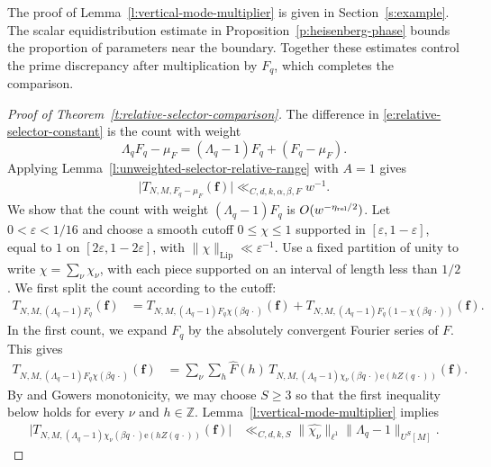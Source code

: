 \documentclass[12pt]{amsart}
\newcommand{\1}{\mathbf 1}
\newcommand{\e}{\mathrm e}
\theoremstyle{definition}
\begin{document}
The proof of Lemma~\ref{l:vertical-mode-multiplier} is given in
Section~\ref{s:example}. The scalar equidistribution estimate in
Proposition~\ref{p:heisenberg-phase} bounds the proportion of
parameters near the boundary. Together these estimates control
the prime discrepancy after multiplication by \(F_q\), which
completes the comparison.

\begin{proof}[Proof of Theorem~\ref{t:relative-selector-comparison}]
 The difference in
\eqref{e:relative-selector-constant} is the count with weight
\[
 \Lambda_qF_q-\mu_F=(\Lambda_q-1)F_q+(F_q-\mu_F).
\]
Applying Lemma~\ref{l:unweighted-selector-relative-range} with
\(A=1\) gives
\begin{align}\label{e:f-muf}
    \bigl|T_{N,M,F_q-\mu_F}(\mathbf f)\bigr|
 \ll_{C,d,k,\alpha,\beta,F} w^{-1}.
\end{align}
We show that the count
with weight \((\Lambda_q-1)F_q\) is \(O(w^{-\eta_{\rm rel}/2})\).
Let \(0<\varepsilon<1/16\) and choose a smooth cutoff
\(0\le\chi\le1\) supported in \([\varepsilon,1-\varepsilon]\),
equal to \(1\) on \([2\varepsilon,1-2\varepsilon]\), with
\(\|\chi\|_{\mathrm{Lip}}\ll\varepsilon^{-1}\). Use a fixed
partition of unity to write \(\chi=\sum_\nu\chi_\nu\), with each
piece supported on an interval of length less than \(1/2\).
We first split the count according to the cutoff:
\begin{align}\label{e:firstsecondterms}
 T_{N,M,(\Lambda_q-1)F_q}(\mathbf f)
 &=T_{N,M,(\Lambda_q-1)F_q\chi(\beta q\,\cdot)}(\mathbf f)+T_{N,M,(\Lambda_q-1)F_q(1-\chi(\beta q\,\cdot))}
   (\mathbf f).
\end{align}
In the first count, we expand \(F_q\) by the absolutely convergent
Fourier series of \(F\). This gives
\[
\begin{aligned}
 T_{N,M,(\Lambda_q-1)F_q\chi(\beta q\,\cdot)}(\mathbf f)
 &=\sum_\nu\sum_{h}\widehat F(h)\,
   T_{N,M,(\Lambda_q-1)\chi_\nu(\beta q\,\cdot)
     \e(hZ(q\,\cdot))}(\mathbf f).
\end{aligned}
\]
By \cite[Proposition~3.3]{KMTT} and Gowers monotonicity, we may
choose \(S\ge3\) so that the first inequality below holds for
every \(\nu\) and \(h\in\mathbb Z\). 
Lemma~\ref{l:vertical-mode-multiplier} implies
\begin{equation}\label{e:high-order-gvn}
\begin{aligned}
 \bigl|T_{N,M,(\Lambda_q-1)\chi_\nu(\beta q\,\cdot)
                  \e(hZ(q\,\cdot))}(\mathbf f)\bigr|&\ll_{C,d,k,S}
 \|\widehat{\chi_\nu}\|_{\ell^1}\|\Lambda_q-1\|_{U^S[M]}.

\end{aligned}
\end{equation}
\end{proof}
\end{document}
